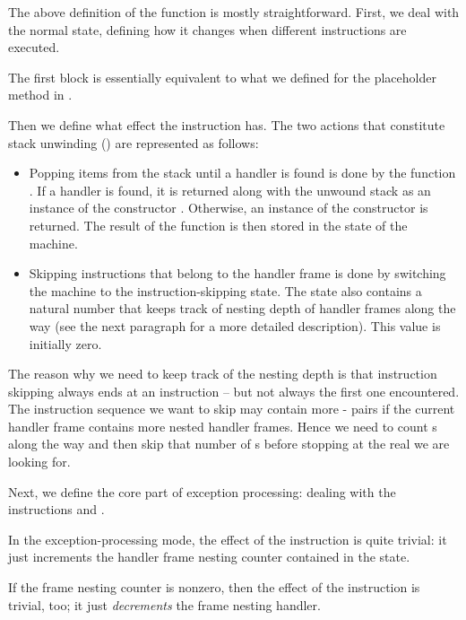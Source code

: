 \noindent The above definition of the function  is mostly
straightforward.  First, we deal with the normal state, defining how it changes
when different instructions are executed.

The first block is essentially equivalent to what we defined for the
placeholder method in .

Then we define what effect the instruction  has. The two actions
that constitute stack unwinding () are
represented as follows:

\begin{itemize}
	\item Popping items from the stack until a handler is found is done by the
		function . If a handler is found, it is returned
		along with the unwound stack as an instance of the constructor
		. Otherwise, an instance of the constructor
		 is returned.
		The result of the function  is then stored in the
		state of the machine.

	\item Skipping instructions that belong to the handler frame is done by
		switching the machine to the instruction-skipping state. The state also
		contains a natural number that keeps track of nesting depth of handler
		frames along the way (see the next paragraph for a more detailed
		description). This value is initially zero.
\end{itemize}

The reason why we need to keep track of the nesting depth is that instruction
skipping always ends at an  instruction -- but not always the
first one encountered. The instruction sequence we want to skip may contain
more - pairs if the current handler frame contains
more nested handler frames. Hence we need to count s along the way
and then skip that number of s before stopping at the real
 we are looking for.

Next, we define the core part of exception processing: dealing with the
instructions  and .

In the exception-processing mode, the effect of the instruction  is
quite trivial: it just increments the handler frame nesting counter contained
in the state.

If the frame nesting counter is nonzero, then the effect of the instruction
 is trivial, too; it just \emph{decrements} the frame nesting
handler.

